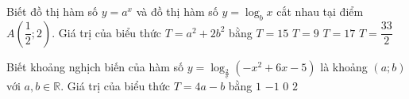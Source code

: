 \begin{ex}%
	Biết đồ thị hàm số $y=a^x$ và đồ thị hàm số $y=\log_bx$ cắt nhau tại điểm $A\left(\dfrac{1}{2};2\right)$. Giá trị của biểu thức $T=a^2+2b^2$ bằng
	\choice
	{$T=15$}
	{$T=9$}	
	{\True $T=17$}
	{$T=\dfrac{33}{2}$}
\end{ex}
\begin{ex}%
	Biết khoảng nghịch biến của hàm số $y=\log _{\frac{2}{\mathrm{e}}}(-x^2+6x-5)$ là khoảng $(a;b)$ với $a,b\in \mathbb{R}$. Giá trị của biểu thức $T=4a-b$ bằng
	\choice
	{\True $1$}
	{$-1$}
	{$0$}
	{$2$}
\end{ex}

